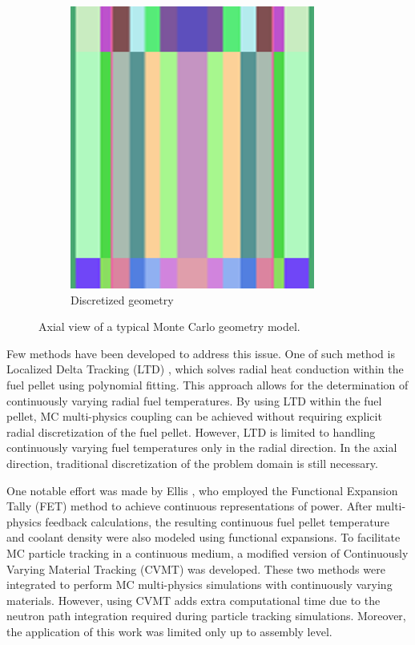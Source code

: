 \begin{figure}
\begin{subfigure}[b]{0.25\textwidth}
        \centering
        \includegraphics[width=\textwidth]{figs/sec_1b.png}
        \caption{Discretized geometry}
        \label{fig_1b}
    \end{subfigure}
    \caption{Axial view of a typical Monte Carlo geometry model.}
       \label{fig_1}
\end{figure}

Few methods have been developed to address this issue. One of such method is Localized Delta Tracking (LTD) \cite{nchoi_2020}, which solves radial heat conduction within the fuel pellet using polynomial fitting. This approach allows for the determination of continuously varying radial fuel temperatures. By using LTD within the fuel pellet, MC multi-physics coupling can be achieved without requiring explicit radial discretization of the fuel pellet. However, LTD is limited to handling continuously varying fuel temperatures only in the radial direction. In the axial direction, traditional discretization of the problem domain is still necessary.

One notable effort was made by Ellis \cite{ellis}, who employed the Functional Expansion Tally (FET) method \cite{chadsey,gries} to achieve continuous representations of power. After multi-physics feedback calculations, the resulting continuous fuel pellet temperature and coolant density were also modeled using functional expansions. To facilitate MC particle tracking in a continuous medium, a modified version of Continuously Varying Material Tracking (CVMT) \cite{brown} was developed. These two methods were integrated to perform MC multi-physics simulations with continuously varying materials. However, using CVMT adds extra computational time due to the neutron path integration required during particle tracking simulations. Moreover, the application of this work was limited only up to assembly level.

